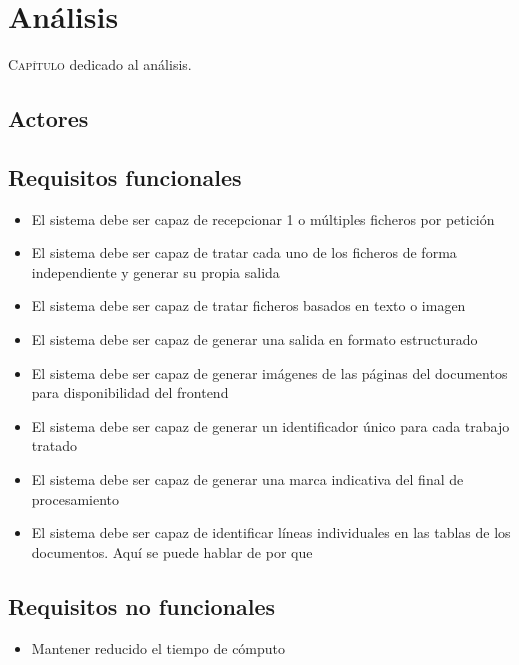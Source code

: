 
\chapter{Análisis}
\label{chap:analisis}

\lettrine{C}{apítulo} dedicado al análisis.

\section{Actores}

\section{Requisitos funcionales}

\begin{itemize}
\item El sistema debe ser capaz de recepcionar 1 o múltiples ficheros por petición
\item El sistema debe ser capaz de tratar cada uno de los ficheros de forma independiente y generar su propia salida
\item El sistema debe ser capaz de tratar ficheros basados en texto o imagen
\item El sistema debe ser capaz de generar una salida en formato estructurado
\item El sistema debe ser capaz de generar imágenes de las páginas del documentos para disponibilidad del frontend
\item El sistema debe ser capaz de generar un identificador único para cada trabajo tratado
\item El sistema debe ser capaz de generar una marca indicativa del final de procesamiento
\item El sistema debe ser capaz de identificar líneas individuales en las tablas de los documentos. Aquí se puede hablar de por que
\end{itemize}

\section{Requisitos no funcionales}

\begin{itemize}
\item Mantener reducido el tiempo de cómputo    
\end{itemize}

